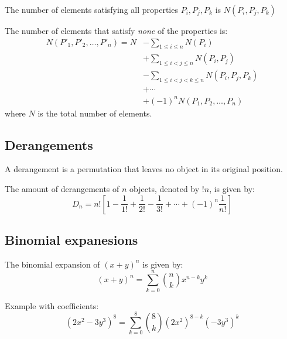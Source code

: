 The number of elements satisfying all properties \( P_i, P_j, P_k \) is \( N(P_i, P_j, P_k) \)

The number of elements that satisfy \textit{none} of the properties is:
\begin{align*}
    N( P'_1, P'_2, \ldots, P'_n)
= N &- \sum_{1 \le i \le n} N(P_i) \\
&+ \sum_{1 \le i < j \le n} N(P_i, P_j) \\
&- \sum_{1 \le i < j < k \le n} N(P_i, P_j, P_k) \\
&+ \cdots \\
&+ (-1)^n N(P_1, P_2, \ldots, P_n)
\end{align*}
where \(N\) is the total number of elements.

\subsection{Derangements}
A derangement is a permutation that leaves no object in its original position.

The amount of derangements of $n$ objects, denoted by \(!n\), is given by:
\[
    D_n = n! \left[ 1 - \frac{1}{1!} + \frac{1}{2!} - \frac{1}{3!} + \cdots + (-1)^{n}\frac{1}{n!} \right]
\]

\subsection{Binomial expanesions}
The binomial expansion of \((x + y)^n\) is given by:
\[
    (x + y)^n = \sum_{k=0}^{n} \binom{n}{k} x^{n-k} y^k
\]

Example with coefficients:
\[
    (2x^2-3y^3)^8 = \sum_{k=0}^{8} \binom{8}{k} (2x^2)^{8-k} (-3y^3)^k
\]

